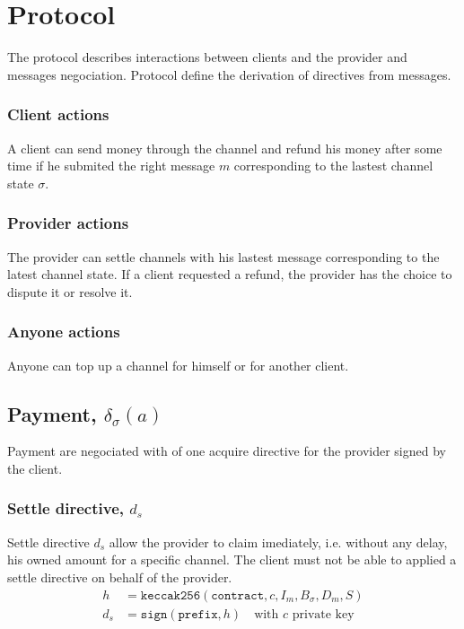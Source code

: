 \documentclass{llncs}
\begin{document}
\section{Protocol} The protocol describes interactions between clients and the provider and messages negociation. Protocol define the derivation of directives from messages.

\subsubsection{Client actions} A client can send money through the channel and refund his money after some time if he submited the right message $m$ corresponding to the lastest channel state $\sigma$.

\subsubsection{Provider actions} The provider can settle channels with his lastest message corresponding to the latest channel state. If a client requested a refund, the provider has the choice to dispute it or resolve it.

\subsubsection{Anyone actions} Anyone can top up a channel for himself or for another client.

\subsection{Payment, $\delta_\sigma(a)$} Payment are negociated with of one acquire directive for the provider signed by the client.

\subsubsection{Settle directive, $d_s$} Settle directive $d_s$ allow the provider to claim imediately, i.e. without any delay, his owned amount for a specific channel. The client must not be able to applied a settle directive on behalf of the provider.
\begin{equation*}
\begin{split}
    h &= \texttt{keccak256}(\texttt{contract},c,I_m,B_\sigma,D_m,S) \\
    d_s &= \texttt{sign}(\texttt{prefix}, h) \quad \text{with $c$ private key} \\
\end{split}
\end{equation*}
\end{document}

